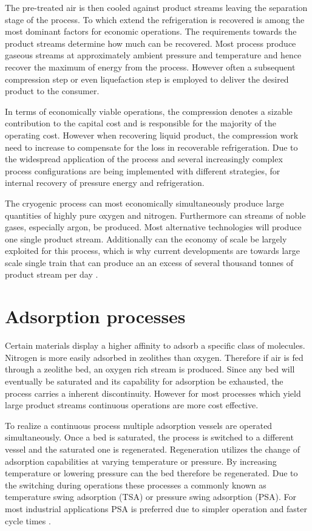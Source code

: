     The pre-treated air is then cooled against product streams leaving the separation stage of the process. To which extend
    the refrigeration is  recovered is among the most dominant factors for economic operations. The requirements
    towards the product streams determine how much can be recovered. Most process produce gaseous streams at
    approximately ambient pressure and temperature \cite{Smith.2001} and hence recover the maximum of energy from the
    process. However often a subsequent compression step or even liquefaction step is employed to deliver the
    desired product to the consumer.

    In terms of economically viable operations, the compression denotes a sizable contribution to the capital cost
    and is responsible for the majority of the operating cost. However when recovering liquid product, the
    compression work need to increase to compensate for the loss in recoverable refrigeration. Due to the widespread
    application of the  process and several increasingly complex process configurations are being implemented
    with different strategies, for internal recovery of pressure energy and refrigeration.

    The cryogenic process can most economically simultaneously produce large quantities of highly pure oxygen and nitrogen.
    Furthermore can streams of noble gases, especially argon, be produced. Most alternative technologies will
    produce one single product stream. Additionally can the economy of scale be largely exploited for this
    process, which is why current developments are towards large scale single train that can produce an
    an excess of several thousand tonnes of product stream per day \cite{Castle.2002}.

    \section{Adsorption processes}
    \label{sec:psa}
    Certain materials display a higher affinity to adsorb a specific class of molecules. Nitrogen is
    more easily adsorbed in zeolithes than oxygen. Therefore if air is fed through a
    zeolithe bed, an oxygen rich stream is produced. Since any bed will eventually
    be saturated and its capability for adsorption be exhausted, the process carries a
    inherent discontinuity. However for most processes which yield large product streams
    continuous operations are more cost effective.

    To realize a continuous process multiple adsorption vessels are operated simultaneously.
    Once a bed is saturated, the process is switched to a different vessel and the saturated one
    is regenerated. Regeneration utilizes the change of adsorption capabilities at varying temperature
    or pressure. By increasing temperature or lowering pressure can the bed therefore be regenerated.
    Due to the switching during operations these processes a commonly known as temperature swing adsorption
    (TSA) or pressure swing adsorption (PSA). For most industrial applications PSA is preferred due to
    simpler operation and faster cycle times \cite{Smith.2001}.

